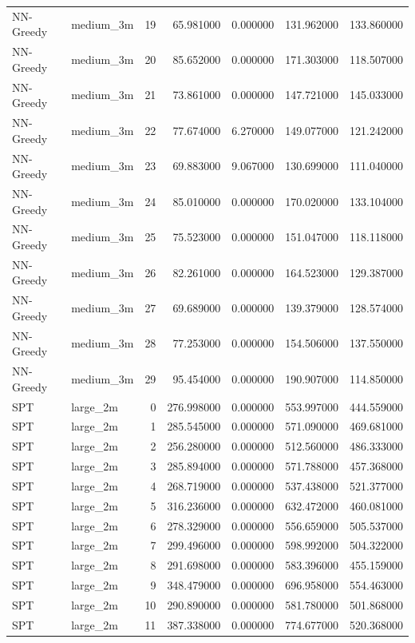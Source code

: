 \begin{tabular}{llrrrrr}
NN-Greedy & medium_3m & 19 & 65.981000 & 0.000000 & 131.962000 & 133.860000 \\
NN-Greedy & medium_3m & 20 & 85.652000 & 0.000000 & 171.303000 & 118.507000 \\
NN-Greedy & medium_3m & 21 & 73.861000 & 0.000000 & 147.721000 & 145.033000 \\
NN-Greedy & medium_3m & 22 & 77.674000 & 6.270000 & 149.077000 & 121.242000 \\
NN-Greedy & medium_3m & 23 & 69.883000 & 9.067000 & 130.699000 & 111.040000 \\
NN-Greedy & medium_3m & 24 & 85.010000 & 0.000000 & 170.020000 & 133.104000 \\
NN-Greedy & medium_3m & 25 & 75.523000 & 0.000000 & 151.047000 & 118.118000 \\
NN-Greedy & medium_3m & 26 & 82.261000 & 0.000000 & 164.523000 & 129.387000 \\
NN-Greedy & medium_3m & 27 & 69.689000 & 0.000000 & 139.379000 & 128.574000 \\
NN-Greedy & medium_3m & 28 & 77.253000 & 0.000000 & 154.506000 & 137.550000 \\
NN-Greedy & medium_3m & 29 & 95.454000 & 0.000000 & 190.907000 & 114.850000 \\
SPT & large_2m & 0 & 276.998000 & 0.000000 & 553.997000 & 444.559000 \\
SPT & large_2m & 1 & 285.545000 & 0.000000 & 571.090000 & 469.681000 \\
SPT & large_2m & 2 & 256.280000 & 0.000000 & 512.560000 & 486.333000 \\
SPT & large_2m & 3 & 285.894000 & 0.000000 & 571.788000 & 457.368000 \\
SPT & large_2m & 4 & 268.719000 & 0.000000 & 537.438000 & 521.377000 \\
SPT & large_2m & 5 & 316.236000 & 0.000000 & 632.472000 & 460.081000 \\
SPT & large_2m & 6 & 278.329000 & 0.000000 & 556.659000 & 505.537000 \\
SPT & large_2m & 7 & 299.496000 & 0.000000 & 598.992000 & 504.322000 \\
SPT & large_2m & 8 & 291.698000 & 0.000000 & 583.396000 & 455.159000 \\
SPT & large_2m & 9 & 348.479000 & 0.000000 & 696.958000 & 554.463000 \\
SPT & large_2m & 10 & 290.890000 & 0.000000 & 581.780000 & 501.868000 \\
SPT & large_2m & 11 & 387.338000 & 0.000000 & 774.677000 & 520.368000 \\

\end{tabular}
